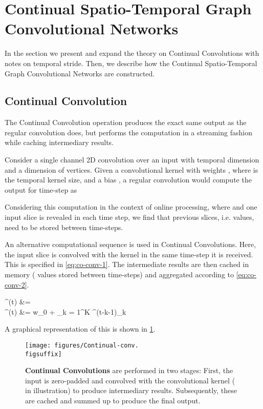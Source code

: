 \documentclass[journal]{IEEEtran}
\newcommand{\figsuffix}{png}
\theoremstyle{definition}
\begin{document}
\section{Continual Spatio-Temporal Graph Convolutional Networks}\label{sec:continual-st-gcn-Section}
In the section we present and expand the theory on Continual Convolutions with notes on temporal stride. Then, we describe how the Continual Spatio-Temporal Graph Convolutional Networks are constructed.

\subsection{Continual Convolution} \label{sec:conv}
The Continual Convolution operation produces the exact same output as the regular convolution does, but performs the computation in a streaming fashion while caching intermediary results.

Consider a single channel 2D convolution over an input  with temporal dimension  and a dimension of  vertices.
Given a convolutional kernel with weights , where  is the temporal kernel size, and a bias , a regular convolution would compute the output  for time-step  as


Considering this computation in the context of online processing, where  and one input slice  is revealed in each time step, we find that  previous slices, i.e.  values, need to be stored between time-steps.

An alternative computational sequence is used in Continual Convolutions. 
Here, the input slice  is convolved with the kernel  in the same time-step it is received. This is specified in \cref{eq:co-conv-1}. The intermediate results are then cached in memory  ( values stored between time-steps) and aggregated according to \cref{eq:co-conv-2}.


        \label{eq:co-conv-1}
        ^{(t)} &= \left[ 
            \sum_{v = 1}^{V} \mathbf{W}_{k,v} \cdot \mathbf{X}_v^{(t)} : \ k \in 1..K
        \right]
        \\
        \label{eq:co-conv-2}
        ^{(t)} &= w_0 + \sum_{k = 1}^{K} ^{(t-k-1)}_k
    
A graphical representation of this is shown in \cref{fig:co-conv}.


\begin{figure}[ht]
    \centering
    \texttt{[image: figures/Continual-conv.\\figsuffix]}
    \caption{\textbf{Continual Convolutions} are performed in two stages: First, the input is zero-padded and convolved with the convolutional kernel ( in illustration) to produce intermediary results. Subsequently, these are cached and summed up to produce the final output. }
    \label{fig:co-conv}
\end{figure}
\end{document}

